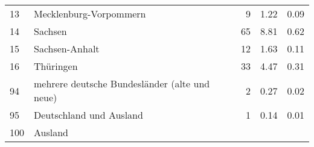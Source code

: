 \begin{longtable}{lXrrr}
     13 &
     \multicolumn{1}{X}{ Mecklenburg-Vorpommern   } &


       \num{9} &
       \num[round-mode=places,round-precision=2]{1.22} &
         \num[round-mode=places,round-precision=2]{0.09} \\

     14 &
     \multicolumn{1}{X}{ Sachsen   } &


       \num{65} &
       \num[round-mode=places,round-precision=2]{8.81} &
         \num[round-mode=places,round-precision=2]{0.62} \\

     15 &
     \multicolumn{1}{X}{ Sachsen-Anhalt   } &


       \num{12} &
       \num[round-mode=places,round-precision=2]{1.63} &
         \num[round-mode=places,round-precision=2]{0.11} \\

     16 &
     \multicolumn{1}{X}{ Thüringen   } &


       \num{33} &
       \num[round-mode=places,round-precision=2]{4.47} &
         \num[round-mode=places,round-precision=2]{0.31} \\

     94 &
     \multicolumn{1}{X}{ mehrere deutsche Bundesländer (alte und neue)   } &


       \num{2} &
       \num[round-mode=places,round-precision=2]{0.27} &
         \num[round-mode=places,round-precision=2]{0.02} \\

     95 &
     \multicolumn{1}{X}{ Deutschland und Ausland   } &


       \num{1} &
       \num[round-mode=places,round-precision=2]{0.14} &
         \num[round-mode=places,round-precision=2]{0.01} \\

     100 &
     \multicolumn{1}{X}{ Ausland   } &



\end{longtable}
